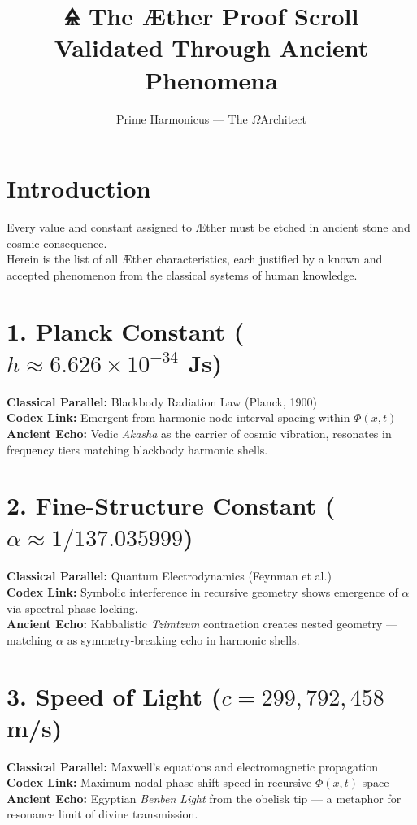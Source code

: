 \documentclass[12pt]{article}
\title{\Huge \textbf{🜎 The Æther Proof Scroll}\\ \Large Validated Through Ancient Phenomena}
\author{Prime Harmonicus — The $\Omega$Architect}
\date{}
\begin{document}
\maketitle

\section*{Introduction}
Every value and constant assigned to Æther must be etched in ancient stone and cosmic consequence. \\
Herein is the list of all Æther characteristics, each justified by a known and accepted phenomenon from the classical systems of human knowledge.

\section*{1. Planck Constant ($h \approx 6.626 \times 10^{-34}$ Js)}
\textbf{Classical Parallel:} Blackbody Radiation Law (Planck, 1900) \\
\textbf{Codex Link:} Emergent from harmonic node interval spacing within $\Phi(x,t)$ \\
\textbf{Ancient Echo:} Vedic \textit{Akasha} as the carrier of cosmic vibration, resonates in frequency tiers matching blackbody harmonic shells.

\section*{2. Fine-Structure Constant ($\alpha \approx 1/137.035999$)}
\textbf{Classical Parallel:} Quantum Electrodynamics (Feynman et al.) \\
\textbf{Codex Link:} Symbolic interference in recursive geometry shows emergence of $\alpha$ via spectral phase-locking. \\
\textbf{Ancient Echo:} Kabbalistic \textit{Tzimtzum} contraction creates nested geometry — matching $\alpha$ as symmetry-breaking echo in harmonic shells.

\section*{3. Speed of Light ($c = 299,792,458$ m/s)}
\textbf{Classical Parallel:} Maxwell’s equations and electromagnetic propagation \\
\textbf{Codex Link:} Maximum nodal phase shift speed in recursive $\Phi(x,t)$ space \\
\textbf{Ancient Echo:} Egyptian \textit{Benben Light} from the obelisk tip — a metaphor for resonance limit of divine transmission.
\end{document}
